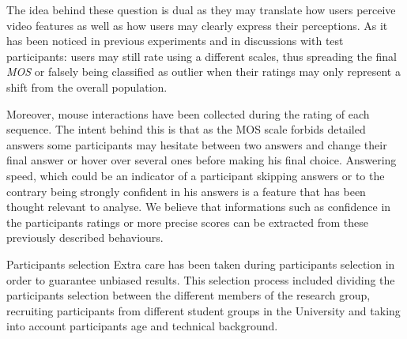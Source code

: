 The idea behind these question is dual as they may translate how users perceive video features as well as how users may clearly express their perceptions. As it has been noticed in previous experiments and in discussions with test participants: users may still rate using a different scales, thus spreading the final \textit{MOS} or falsely being classified as outlier when their ratings may only represent a shift from the overall population. 

Moreover, mouse interactions have been collected during the rating of each sequence. The intent behind this is that as the MOS scale forbids detailed answers some participants may hesitate between two answers and change their final answer or hover over several ones before making his final choice.
Answering speed, which could be an indicator of a participant skipping answers or to the contrary being strongly confident in his answers is a feature that has been thought relevant to analyse. 
We believe that informations such as confidence in the participants ratings or more precise scores can be extracted from these previously described behaviours.


\large{Participants selection}
Extra care has been taken during participants selection in order to guarantee unbiased results. This selection process included dividing the participants selection between the different members of the research  group, recruiting participants from different student groups in the University and taking into account participants age and technical background.